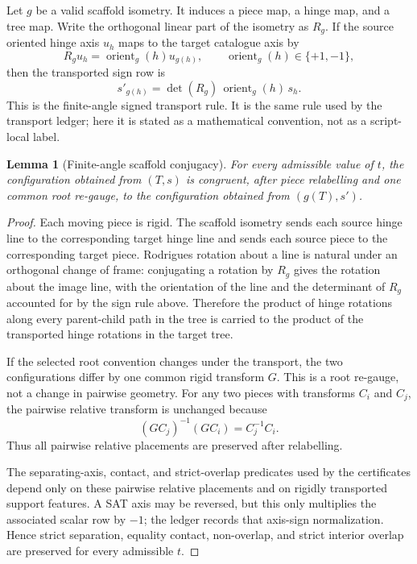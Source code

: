 \documentclass[11pt,a4paper]{article}
\newtheorem{lemma}[theorem]{Lemma}
\theoremstyle{definition}
\theoremstyle{remark}
\begin{document}
Let \(g\) be a valid scaffold isometry.  It induces a piece map, a hinge map, and a tree map.  Write the orthogonal linear part of the isometry as \(R_g\).  If the source oriented hinge axis \(u_h\) maps to the target catalogue axis by
\[
  R_g u_h = \operatorname{orient}_g(h) u_{g(h)},
  \qquad \operatorname{orient}_g(h) \in \{+1,-1\},
\]
then the transported sign row is
\[
  s'_{g(h)} = \det(R_g)\, \operatorname{orient}_g(h)\, s_h .
\]
This is the finite-angle signed transport rule.  It is the same rule used by the transport ledger; here it is stated as a mathematical convention, not as a script-local label.

\begin{lemma}[Finite-angle scaffold conjugacy]
For every admissible value of \(t\), the configuration obtained from \((T,s)\) is congruent, after piece relabelling and one common root re-gauge, to the configuration obtained from \((g(T),s')\).
\end{lemma}

\begin{proof}
Each moving piece is rigid.  The scaffold isometry sends each source hinge line to the corresponding target hinge line and sends each source piece to the corresponding target piece.  Rodrigues rotation about a line is natural under an orthogonal change of frame: conjugating a rotation by \(R_g\) gives the rotation about the image line, with the orientation of the line and the determinant of \(R_g\) accounted for by the sign rule above.  Therefore the product of hinge rotations along every parent-child path in the tree is carried to the product of the transported hinge rotations in the target tree.

If the selected root convention changes under the transport, the two configurations differ by one common rigid transform \(G\).  This is a root re-gauge, not a change in pairwise geometry.  For any two pieces with transforms \(C_i\) and \(C_j\), the pairwise relative transform is unchanged because
\[
  (G C_j)^{-1}(G C_i) = C_j^{-1} C_i .
\]
Thus all pairwise relative placements are preserved after relabelling.

The separating-axis, contact, and strict-overlap predicates used by the certificates depend only on these pairwise relative placements and on rigidly transported support features.  A SAT axis may be reversed, but this only multiplies the associated scalar row by \(-1\); the ledger records that axis-sign normalization.  Hence strict separation, equality contact, non-overlap, and strict interior overlap are preserved for every admissible \(t\).
\end{proof}
\end{document}
